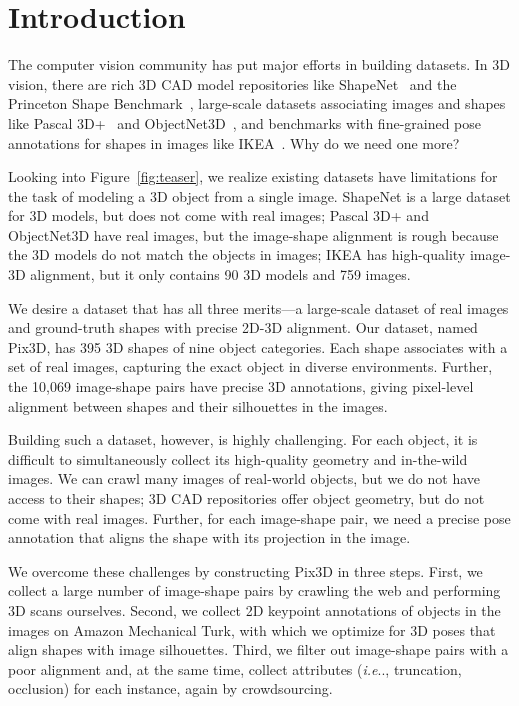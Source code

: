\documentclass[10pt,twocolumn,letterpaper]{article}
\makeatletter
\newcommand{\fig}[1]{Figure~\ref{#1}}
\DeclareRobustCommand\onedot{\futurelet\@let@token\@onedot}
\def\@onedot{\ifx\@let@token.\else.\null\fi\xspace}
\def\ie{\emph{i.e}\onedot} \def\Ie{\emph{I.e}\onedot}
\newcommand{\data}{Pix3D\xspace}
\makeatother
\begin{document}
\section{Introduction}
\label{sec:intro}

The computer vision community has put major efforts in building datasets. In 3D vision, there are rich 3D CAD model repositories like ShapeNet~\cite{Chang2015Shapenet:} and the Princeton Shape Benchmark~\cite{Shilane2004princeton}, large-scale datasets associating images and shapes like Pascal 3D+~\cite{Xiang2014PASCAL:} and ObjectNet3D~\cite{Xiang2016Objectnet3d:}, and benchmarks with fine-grained pose annotations for shapes in images like IKEA~\cite{Lim2013Parsing}. Why do we need one more?

Looking into \fig{fig:teaser}, we realize existing datasets have limitations for the task of modeling a 3D object from a single image. ShapeNet is a large dataset for 3D models, but does not come with real images; Pascal 3D+ and ObjectNet3D have real images, but the image-shape alignment is rough because the 3D models do not match the objects in images; IKEA has high-quality image-3D alignment, but it only contains 90 3D models and 759 images.

We desire a dataset that has all three merits---a large-scale dataset of real images and ground-truth shapes with precise 2D-3D alignment. Our dataset, named \data, has 395 3D shapes of nine object categories. Each shape associates with a set of real images, capturing the exact object in diverse environments. Further, the 10,069 image-shape pairs have precise 3D annotations, giving pixel-level alignment between shapes and their silhouettes in the images.

Building such a dataset, however, is highly challenging. For each object, it is difficult to simultaneously collect its high-quality geometry and in-the-wild images. We can crawl many images of real-world objects, but we do not have access to their shapes; 3D CAD repositories offer object geometry, but do not come with real images. Further, for each image-shape pair, we need a precise pose annotation that aligns the shape with its projection in the image. 

We overcome these challenges by constructing \data in three steps. 
First, we collect a large number of image-shape pairs by crawling the web and performing 3D scans ourselves. Second, we collect 2D keypoint annotations of objects in the images on Amazon Mechanical Turk, with which we optimize for 3D poses that align shapes with image silhouettes. Third, we filter out image-shape pairs with a poor alignment and, at the same time, collect attributes (\ie, truncation, occlusion) for each instance, again by crowdsourcing.
\end{document}
